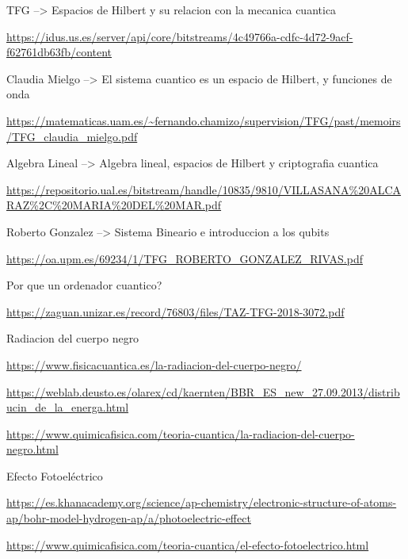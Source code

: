 \documentclass{article}
\numberwithin{equation}{section} %
\begin{document}
        TFG --> Espacios de Hilbert y su relacion con la mecanica cuantica\par
        \url{https://idus.us.es/server/api/core/bitstreams/4c49766a-cdfc-4d72-9acf-f62761db63fb/content}
        \vspace{2mm}

        Claudia Mielgo --> El sistema cuantico es un espacio de Hilbert, y funciones de onda\par
        \url{https://matematicas.uam.es/~fernando.chamizo/supervision/TFG/past/memoirs/TFG\_claudia\_mielgo.pdf}
        \vspace{2mm}

        Algebra Lineal --> Algebra lineal, espacios de Hilbert y criptografia cuantica\par
        \url{https://repositorio.ual.es/bitstream/handle/10835/9810/VILLASANA%20ALCARAZ%2C%20MARIA%20DEL%20MAR.pdf}
        \vspace{2mm}

        Roberto Gonzalez --> Sistema Bineario e introduccion a los qubits\par
        \url{https://oa.upm.es/69234/1/TFG\_ROBERTO\_GONZALEZ\_RIVAS.pdf}
        \vspace{2mm}

        Por que un ordenador cuantico?\par
        \url{https://zaguan.unizar.es/record/76803/files/TAZ-TFG-2018-3072.pdf}
        \vspace{2mm}

        Radiacion del cuerpo negro\par
        \url{https://www.fisicacuantica.es/la-radiacion-del-cuerpo-negro/}
        \vspace{2mm}

        \url{https://weblab.deusto.es/olarex/cd/kaernten/BBR_ES_new_27.09.2013/distribucin_de_la_energa.html}
        \vspace{2mm}

        \url{https://www.quimicafisica.com/teoria-cuantica/la-radiacion-del-cuerpo-negro.html}
        \vspace{2mm}

        Efecto Fotoeléctrico\par
        \url{https://es.khanacademy.org/science/ap-chemistry/electronic-structure-of-atoms-ap/bohr-model-hydrogen-ap/a/photoelectric-effect}
        \vspace{2mm}

        \url{https://www.quimicafisica.com/teoria-cuantica/el-efecto-fotoelectrico.html}
        \vspace{2mm}
\end{document}
